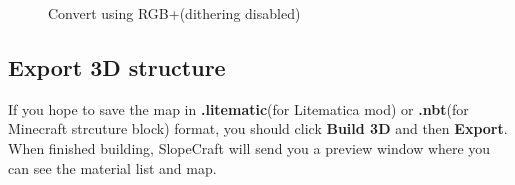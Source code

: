 \documentclass{article}
\begin{document}
\begin{figure}[htbp]
    \centering
    \setcounter{subfigure}{0}
    \caption{Convert using RGB+(dithering disabled)}
\end{figure}

\subsection{Export 3D structure}
If you hope to save the map in \textbf{.litematic}(for Litematica mod) or \textbf{.nbt}(for Minecraft strcuture block) format, you should click \textbf{Build 3D} and then \textbf{Export}. When finished building, SlopeCraft will send you a preview window where you can see the material list and map.
\end{document}
